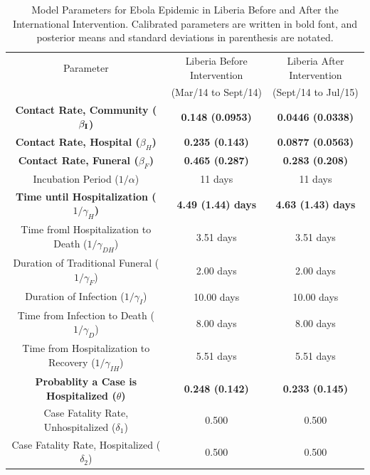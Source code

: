 \begin{table}[ht]
\caption{Model Parameters for Ebola Epidemic in Liberia Before and After the International Intervention. Calibrated parameters are written in bold font, and posterior means and standard deviations in parenthesis are notated.} %
\centering %
\begin{tabular}{c c c }
\hline\hline %
Parameter & Liberia Before Intervention  & Liberia After Intervention \\ [0.5ex]
 & (Mar/14 to Sept/14) &  (Sept/14 to Jul/15) \\ [0.5ex] %
\hline %
\bf {Contact Rate, Community  ($\bf{\beta_{I}}$) }& \bf{0.148 (0.0953)} & \bf{0.0446 (0.0338)}  \\
\bf Contact Rate, Hospital  ($\beta_{H}$) &\bf 0.235 (0.143)& \bf 0.0877 (0.0563) \\
\bf Contact Rate, Funeral  ($\beta_{F}$) & \bf 0.465 (0.287)& \bf 0.283 (0.208) \\
Incubation Period (${1}/{\alpha}$) & 11 days & 11 days  \\
\bf Time until Hospitalization (${1}/{\gamma_{H}}$) &\bf 4.49 (1.44) days & \bf 4.63 (1.43) days  \\
Time froml Hospitalization to Death (${1}/{\gamma_{DH}}$) & 3.51 days & 3.51 days  \\
Duration of Traditional Funeral (${1}/{\gamma_{F}}$) & 2.00 days & 2.00 days  \\
Duration of Infection (${1}/{\gamma_{I}}$) & 10.00 days & 10.00 days  \\
Time from Infection to Death (${1}/{\gamma_{D}}$) & 8.00 days & 8.00 days  \\
Time from Hospitalization to Recovery (${1}/{\gamma_{IH}}$) & 5.51 days & 5.51 days  \\
\bf Probablity a Case is Hospitalized ($\theta$) & \bf 0.248 (0.142) & \bf 0.233 (0.145) \\
Case Fatality Rate, Unhospitalized ($\delta_{1}$) & 0.500  & 0.500  \\
Case Fatality Rate, Hospitalized ($\delta_{2}$) & 0.500 & 0.500 \\ [1ex]
\hline
\end{tabular}
\label{tab:parameters}
\end{table}


